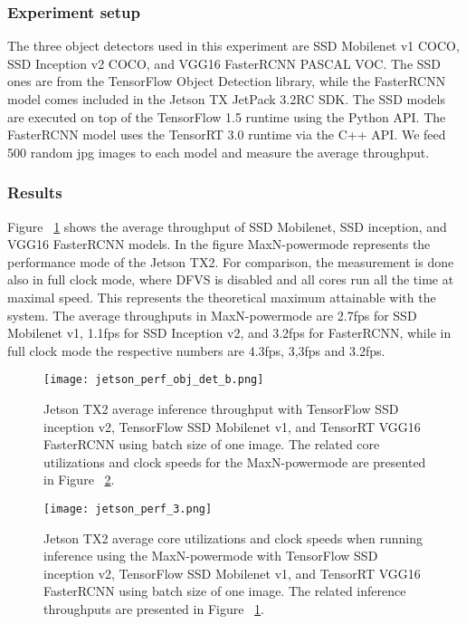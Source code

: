\documentclass[sigconf]{acmart}
\begin{document}
\subsubsection{Experiment setup}

The three object detectors used in this experiment are SSD Mobilenet v1 COCO, SSD Inception v2 COCO, and VGG16 FasterRCNN PASCAL VOC. The SSD ones are from the TensorFlow Object Detection library, while the FasterRCNN model comes included in the Jetson TX JetPack 3.2RC SDK. The SSD models are executed on top of the TensorFlow 1.5 runtime using the Python API. The FasterRCNN model uses the TensorRT 3.0 runtime via the C++ API. We feed 500 random jpg images to each model and measure the average throughput.

\subsubsection{Results}

Figure ~\ref{fig:jetson_perf_obj_det} shows the average throughput of SSD Mobilenet, SSD inception, and VGG16 FasterRCNN models.
In the figure MaxN-powermode represents the performance mode of the Jetson TX2. For comparison, the measurement is done also in full clock mode, where DFVS is disabled and all cores run all the time at maximal speed. This represents the theoretical maximum attainable with the system. The average throughputs in MaxN-powermode are 2.7fps for SSD Mobilenet v1, 1.1fps for SSD Inception v2, and 3.2fps for FasterRCNN, while in full clock mode the respective numbers are 4.3fps, 3,3fps and 3.2fps.

\begin{figure}[t]
\centering
\texttt{[image: jetson\_perf\_obj\_det\_b.png]}
\caption{Jetson TX2 average inference throughput with TensorFlow SSD inception v2, TensorFlow SSD Mobilenet v1, and TensorRT VGG16 FasterRCNN using batch size of one image. The related core utilizations and clock speeds for the MaxN-powermode are presented in Figure ~\ref{fig:jetson_perf_3}.}

\label{fig:jetson_perf_obj_det}
\end{figure}\begin{figure}[t]
\centering
\texttt{[image: jetson\_perf\_3.png]}
\caption{Jetson TX2 average core utilizations and clock speeds when running inference using the MaxN-powermode with TensorFlow SSD inception v2, TensorFlow SSD Mobilenet v1, and TensorRT VGG16 FasterRCNN using batch size of one image. The related inference throughputs are presented in Figure ~\ref{fig:jetson_perf_obj_det}.}
\label{fig:jetson_perf_3}
\end{figure}
\end{document}
